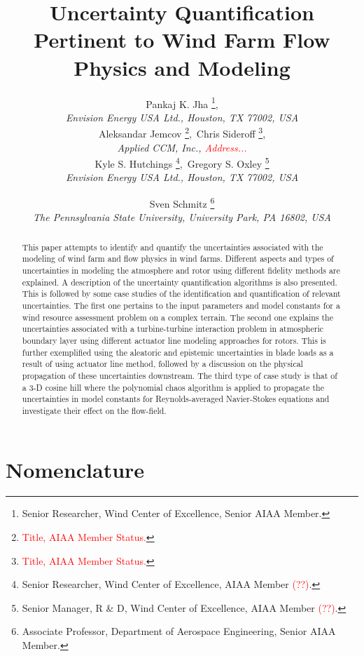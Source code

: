 \documentclass[]{aiaa-tc}%
\title{Uncertainty Quantification Pertinent to Wind Farm Flow Physics and Modeling}
\author{
    Pankaj K. Jha%
    \thanks{Senior Researcher, Wind Center of Excellence, Senior AIAA Member.},\\
   {\normalsize\itshape
   Envision Energy USA Ltd., Houston, TX 77002, USA}\\
    Aleksandar Jemcov%
    \thanks{\textcolor{red}{Title, AIAA Member Status.}},\
    Chris Sideroff%
    \thanks{\textcolor{red}{Title, AIAA Member Status.}},\\
   {\normalsize\itshape
   Applied CCM, Inc., \textcolor{red}{Address...}}\\
    Kyle S. Hutchings%
   \thanks{Senior Researcher, Wind Center of Excellence, AIAA Member \textcolor{red}{(??)}.},\
    Gregory S. Oxley%
   \thanks{Senior Manager, R \& D, Wind Center of Excellence, AIAA Member \textcolor{red}{(??)}.}\\
  {\normalsize\itshape
   Envision Energy USA Ltd., Houston, TX 77002, USA}\\
  \and
  Sven Schmitz %
   \thanks{Associate Professor, Department of Aerospace Engineering, Senior AIAA Member.}\\
  {\normalsize\itshape
  The Pennsylvania State University, University Park, PA 16802, USA}
 }
\begin{document}
\maketitle

\begin{abstract}
This paper attempts to identify and quantify the uncertainties associated with the modeling of wind farm and flow physics in wind farms. Different aspects and types of uncertainties in modeling the atmosphere and rotor using different fidelity methods are explained. A description of the uncertainty quantification algorithms is also presented. This is followed by some case studies of the identification and quantification of relevant uncertainties. The first one pertains to the input parameters and model constants for a wind resource assessment problem on a complex terrain. The second one explains the uncertainties associated with a turbine-turbine interaction problem in atmospheric boundary layer using different actuator line modeling approaches for rotors. This is further exemplified using the aleatoric and epistemic uncertainties in blade loads as a result of using actuator line method, followed by a discussion on the physical propagation of these uncertainties downstream. The third type of case study is that of a 3-D cosine hill where the polynomial chaos algorithm is applied to propagate the uncertainties in model constants for Reynolds-averaged Navier-Stokes equations and investigate their effect on the flow-field.    
\end{abstract}

\section*{Nomenclature}
\end{document}
